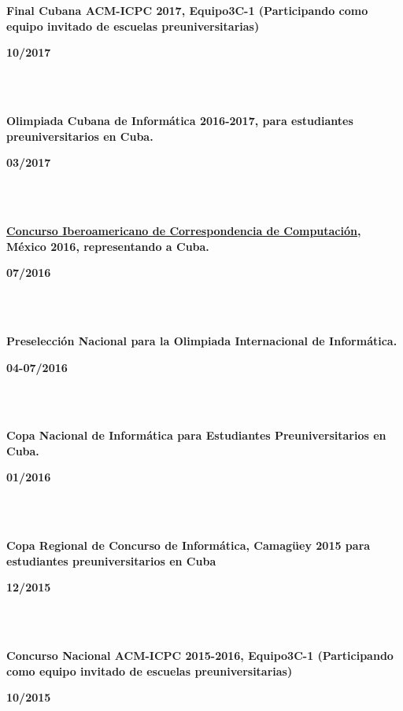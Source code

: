 \documentclass{article}
\begin{document}
\begin{minipage}{0.8\textwidth}
\parbox{0.8\linewidth}{\textbf{Final Cubana ACM-ICPC 2017, Equipo3C-1 (Participando como equipo invitado de escuelas preuniversitarias)}} \hfill \textbf{10/2017}\\
\\
\end{minipage}\\
\begin{minipage}{0.8\textwidth}
\parbox{0.8\linewidth}{\textbf{Olimpiada Cubana de Informática 2016-2017, para estudiantes preuniversitarios en Cuba.}} \hfill \textbf{03/2017}\\
\\
\end{minipage}\\
\begin{minipage}{0.8\textwidth}
\parbox{0.8\linewidth}{\textbf{\hyperref[sec:ibero]{Concurso Iberoamericano de Correspondencia de Computación}, México 2016, representando a Cuba.}} \hfill \textbf{07/2016}\\
\\
\end{minipage}\\
\begin{minipage}{0.8\textwidth}
\parbox{0.8\linewidth}{\textbf{Preselección Nacional para la Olimpiada Internacional de Informática.}} \hfill \textbf{04-07/2016}\\
\\
\end{minipage}\\
\begin{minipage}{0.8\textwidth}
\parbox{0.8\linewidth}{\textbf{Copa Nacional de Informática para Estudiantes Preuniversitarios en Cuba.}} \hfill \textbf{01/2016}\\
\\
\end{minipage}\\
\begin{minipage}{0.8\textwidth}
\parbox{0.8\linewidth}{\textbf{Copa Regional de Concurso de Informática, Camagüey 2015 para estudiantes preuniversitarios en Cuba}} \hfill \textbf{12/2015}\\
\\
\end{minipage}\\
\begin{minipage}{0.8\textwidth}
\parbox{0.8\linewidth}{\textbf{Concurso Nacional ACM-ICPC 2015-2016, Equipo3C-1 (Participando como equipo invitado de escuelas preuniversitarias)}} \hfill \textbf{10/2015}\\
\\
\end{minipage}\\
\end{document}
